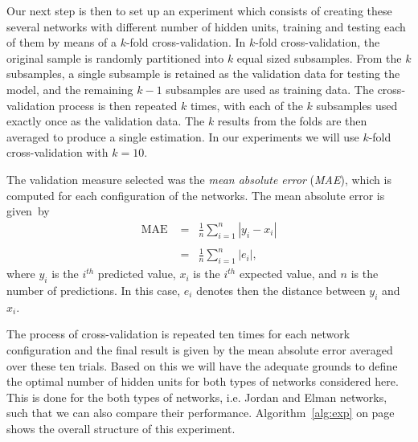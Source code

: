 Our next step is then to set up an experiment which consists of creating these several networks with different number of hidden units, training and testing each of them by means of a $k$-fold cross-validation. In $k$-fold cross-validation, the original sample is randomly partitioned into $k$ equal sized subsamples. From the $k$ subsamples, a single subsample is retained as the validation data for testing the model, and the remaining $k-1$ subsamples are used as training data. The cross-validation process is then repeated $k$ times, with each of the $k$ subsamples used exactly once as the validation data. The $k$ results from the folds are then averaged to produce a single estimation. In our experiments we will use $k$-fold cross-validation with $k = 10$.

The validation measure selected was the \textit{mean absolute error} (\textit{MAE}), which is computed for each configuration of the networks. The mean absolute error is given~by
\[
\begin{array}{lcl}
\mbox{MAE } &=& \frac{1}{n}\sum_{i=1}^{n}|y_i - x_i| \\&&\\
		     &=& \frac{1}{n}\sum_{i=1}^{n}|e_i|,
\end{array}
\]
where $y_i$ is the $i^{th}$ predicted value, $x_i$ is the $i^{th}$ expected value, and $n$ is the number of predictions. In this case, $e_i$ denotes then the distance between $y_i$ and $x_i$. 

The process of cross-validation is repeated ten times for each network configuration and the final result is given by the mean absolute error averaged over these ten trials. Based on this we will have the adequate grounds to define the optimal number of hidden units for both types of networks considered here. This is done for the both types of networks, i.e. Jordan and Elman networks, such that we can also compare their performance. Algorithm~\ref{alg:exp} on page~\pageref{alg:exp} shows the overall structure of this experiment.

